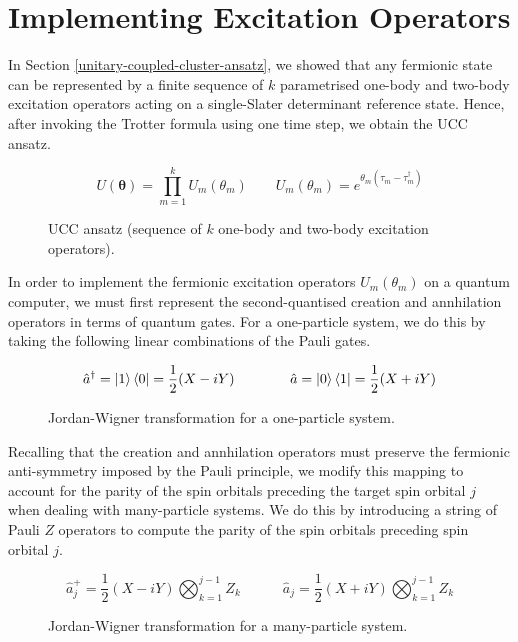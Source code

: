 \section{Implementing Excitation Operators}

In Section \ref{unitary-coupled-cluster-ansatz}, we showed that any fermionic state can be represented by a finite sequence of $k$ parametrised one-body and two-body excitation operators acting on a single-Slater determinant reference state. Hence, after invoking the Trotter formula using one time step, we obtain the UCC ansatz.

\begin{figure}[H]
    \centering
    \begin{equation*}
        U(\bm\theta) = \prod_{m=1}^k U_m(\theta_m) \qquad
        U_m(\theta_m) = e^{\theta_m (\tau_m - \tau_m^\dagger)}
    \end{equation*}
    \caption{UCC ansatz (sequence of $k$ one-body and two-body excitation operators).}
\end{figure}

In order to implement the fermionic excitation operators $U_m(\theta_m)$ on a quantum computer, we must first represent the second-quantised creation and annhilation operators in terms of quantum gates. For a one-particle system, we do this by taking the following linear combinations of the Pauli gates.

\begin{figure}[H]
    \centering
    \begin{equation*}
        \hat a^\dagger = \ket 1 \bra 0 = \frac{1}{2} (X - iY) \qquad\qquad
        \hat a = \ket 0 \bra 1 = \frac{1}{2} (X + iY) 
    \end{equation*}
    \caption{Jordan-Wigner transformation for a one-particle system.}
\end{figure}

Recalling that the creation and annhilation operators must preserve the fermionic anti-symmetry imposed by the Pauli principle, we modify this mapping to account for the parity of the spin orbitals preceding the target spin orbital $j$ when dealing with many-particle systems. We do this by introducing a string of Pauli $Z$ operators to compute the parity of the spin orbitals preceding spin orbital $j$.

\begin{figure}[H]
    \centering
    \begin{equation*}
        \hat a_j^+ = \frac{1}{2} (X - iY) \bigotimes_{k=1}^{j-1} Z_k \qquad\quad
        \hat a_j = \frac{1}{2} (X + iY) \bigotimes_{k=1}^{j-1} Z_k
    \end{equation*}
    \caption{Jordan-Wigner transformation for a many-particle system.}
\end{figure}

